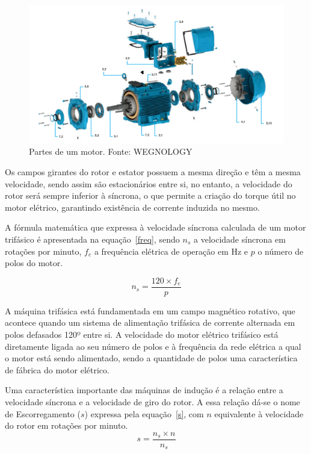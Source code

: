 \documentclass[a4paper, 12pt,oneside, english, brazil]{abntex2}
\begin{document}
\begin{figure}[H]
    \centering
    \includegraphics[scale=0.26]{motor.png}
    \caption{Partes de um motor. Fonte: WEGNOLOGY}
    \label{parts}
\end{figure}

Os campos girantes do rotor e estator possuem a mesma direção e têm a mesma velocidade, sendo assim são estacionários entre si, no entanto, a velocidade do rotor será sempre inferior à síncrona, o que permite a criação do torque útil no motor elétrico, garantindo existência de corrente induzida no mesmo.

A fórmula matemática que expressa à velocidade síncrona calculada de um motor trifásico é apresentada na equação~\eqref{freq}, sendo $n_{s}$ a velocidade síncrona em rotações por minuto, $f_{e}$ a frequência elétrica de operação em Hz e $p$ o número de polos do motor.

\begin{equation}
    n_{s}=\frac{120 \times f_{e}}{p}
    \label{freq}
\end{equation}

A máquina trifásica está fundamentada em um campo magnético rotativo, que acontece quando um sistema de alimentação trifásica de corrente alternada em polos defasados 120º entre si. A velocidade do motor elétrico trifásico está diretamente ligada ao seu número de polos e à frequência da rede elétrica a qual o motor está sendo alimentado, sendo a quantidade de polos uma característica de fábrica do motor elétrico.

Uma característica importante das máquinas de indução é a relação entre a velocidade síncrona e a velocidade de giro do rotor. A essa relação dá-se o nome de Escorregamento ($s$) expressa pela equação~\eqref{s}, com $n$ equivalente à velocidade do rotor em rotações por minuto.
\begin{equation}
    s=\frac{n_{s}\times n}{n_{s}} 
    \label{s}
\end{equation}
\end{document}
